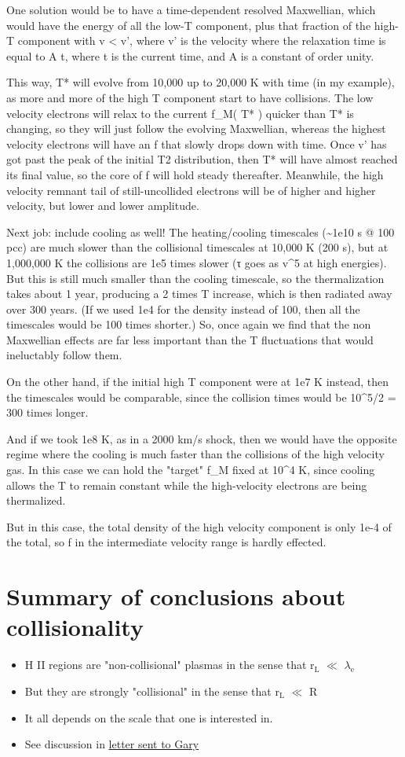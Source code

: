 \documentclass[11pt]{article}
\begin{document}
One solution would be to have a time-dependent resolved Maxwellian, which would have the energy of all the low-T component, plus that fraction of the high-T component with v < v’, where v’ is the velocity where the relaxation time is equal to A t, where t is the current time, and A is a constant of order unity.

This way, T* will evolve from 10,000 up to 20,000 K with time (in my example), as more and more of the high T component start to have collisions. The low velocity electrons will relax to the current f\_M( T* ) quicker than T* is changing, so they will just follow the evolving Maxwellian, whereas the highest velocity electrons will have an f that slowly drops down with time. Once v’ has got past the peak of the initial T2 distribution, then T* will have almost reached its final value, so the core of f will hold steady thereafter. Meanwhile, the high velocity remnant tail of still-uncollided electrons will be of higher and higher velocity, but lower and lower amplitude.

Next job: include cooling as well! The heating/cooling timescales (\textasciitilde{}1e10 s @ 100 pcc) are much slower than the collisional timescales at 10,000 K (200 s), but at 1,000,000 K the collisions are 1e5 times slower (τ goes as v\^{}5 at high energies). But this is still much smaller than the cooling timescale, so the thermalization takes about 1 year, producing a 2 times T increase, which is then radiated away over 300 years. (If we used 1e4 for the density instead of 100, then all the timescales would be 100 times shorter.) So, once again we find that the non Maxwellian effects are far less important than the T fluctuations that would ineluctably follow them.

On the other hand, if the initial high T component were at 1e7 K instead, then the timescales would be comparable, since the collision times would be 10\^{}5/2 = 300 times longer.

And if we took 1e8 K, as in a 2000 km/s shock, then we would have the opposite regime where the cooling is much faster than the collisions of the high velocity gas. In this case we can hold the "target" f\_M fixed at 10\^{}4 K, since cooling allows the T to remain constant while the high-velocity electrons are being thermalized.

But in this case, the total density of the high velocity component is only 1e-4 of the total, so f in the intermediate velocity range is hardly effected.
\section{Summary of conclusions about collisionality}
\label{sec:orgheadline29}
\begin{itemize}
\item H II regions are "non-collisional" plasmas in the sense that r\(_{\text{L}}\) \(\ll\) \(\lambda_{\text{e}}\)
\item But they are strongly "collisional" in the sense that r\(_{\text{L}}\) \(\ll\) R
\item It all depends on the scale that one is interested in.
\item See discussion in \hyperref[sec:orgheadline5]{letter sent to Gary}
\end{itemize}
\end{document}
